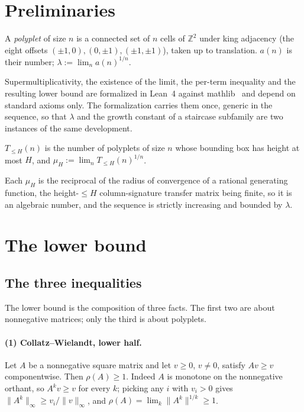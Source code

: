 \documentclass[11pt]{article}
\newcommand{\Z}{\mathbb{Z}}
\newcommand{\rhoo}{\rho}
\begin{document}
\section{Preliminaries}

\begin{definition}
A \emph{polyplet} of size $n$ is a connected set of $n$ cells of $\Z^2$ under
king adjacency (the eight offsets $(\pm1,0),(0,\pm1),(\pm1,\pm1)$), taken up to
translation. $a(n)$ is their number; $\lambda := \lim_n a(n)^{1/n}$.
\end{definition}

Supermultiplicativity, the existence of the limit, the per-term inequality and
the resulting lower bound are formalized in Lean~4 against
mathlib~\cite{mathlib} and depend on standard axioms only. The formalization
carries them once, generic in the sequence, so that $\lambda$ and the growth
constant of a staircase subfamily are two instances of the same development.

\begin{definition}
\label{def:strip}
$T_{\le H}(n)$ is the number of polyplets of size $n$ whose bounding box has
height at most $H$, and
$\mu_H := \lim_n T_{\le H}(n)^{1/n}$.
\end{definition}

Each $\mu_H$ is the reciprocal of the radius of convergence of a rational
generating function, the height-$\le H$ column-signature transfer matrix being
finite, so it is an algebraic number, and the sequence is strictly increasing
and bounded by $\lambda$.

\section{The lower bound}
\label{sec:lower}

\subsection{The three inequalities}

The lower bound is the composition of three facts. The first two are about
nonnegative matrices; only the third is about polyplets.

\paragraph{(1) Collatz--Wielandt, lower half.} Let $A$ be a nonnegative square
matrix and let $v \ge 0$, $v \ne 0$, satisfy $Av \ge v$ componentwise. Then
$\rhoo(A) \ge 1$. Indeed $A$ is monotone on the nonnegative orthant, so
$A^k v \ge v$ for every $k$; picking any $i$ with $v_i > 0$ gives
$\|A^k\|_\infty \ge v_i/\|v\|_\infty$, and $\rhoo(A) = \lim_k \|A^k\|^{1/k} \ge 1$.
\end{document}
